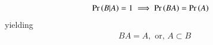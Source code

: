 \begin{align} \Pr\left(B|A\right)=1
 \implies \Pr\left(BA\right)&=\Pr\left(A\right)\end{align}
 yielding
\begin{align}
     BA = A, 
	\text{ or, } A \subset B 
\end{align}

